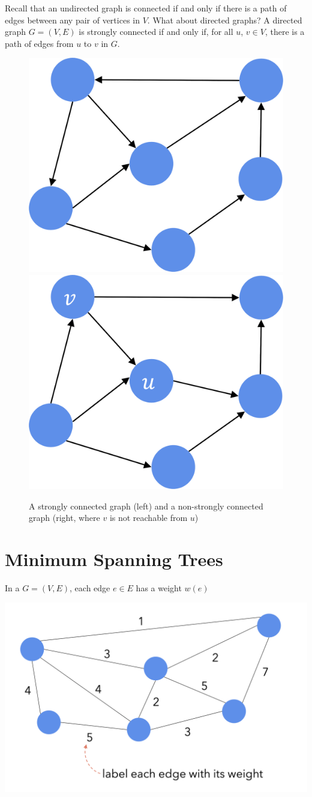 Recall that an undirected graph is connected if and only if there is a path of edges between any pair of vertices in $V$. What about directed graphs? A directed graph $G = (V, E)$ is strongly connected if and only if, for all $u$, $v \in V$, there is a path of edges from $u$ to $v$ in $G$. 

\begin{figure}[H]
    \centering
    \includegraphics[width=0.2\linewidth]{images/Strongly-Connected.png}
    \qquad
    \includegraphics[width=0.2\linewidth]{images/Not-Strongly-Connected.png}
    \caption*{A strongly connected graph (left) and a non-strongly connected graph (right, where $v$ is not reachable from $u$)}
\end{figure}


\section{Minimum Spanning Trees}

In a  $G = (V, E)$, each edge $e \in E$ has a weight $w(e)$

\begin{center} \includegraphics[width=0.5\linewidth]{images/Weighted-Graph.png} \end{center}

